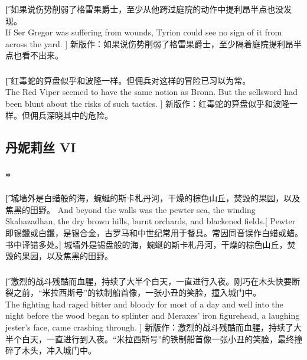 \documentclass[12pt,a4paper]{article}
\begin{document}
\subsubsection{}\t[	
	如果说伤势削弱了格雷果爵士，至少从他跨过庭院的动作中提利昂半点也没发现。\\
	If Ser Gregor was suffering from wounds, Tyrion could see no sign of it from across the yard. ]
	新版作：如果说伤势削弱了格雷果爵士，至少隔着庭院提利昂半点也看不出来。

\subsubsection{}\t[
	红毒蛇的算盘似乎和波隆一样。但佣兵对这样的冒险已习以为常。\\
	The Red Viper seemed to have the same notion as Bronn. But the sellsword had been blunt about the risks of such tactics. ]
	新版作：红毒蛇的算盘似乎和波隆一样。但佣兵深晓其中的危险。	
	
\subsection{丹妮莉丝 VI}

\subsubsection{\color{red}*}\t[
	城墙外是白蜡般的海，蜿蜒的斯卡札丹河，干燥的棕色山丘，焚毁的果园，以及焦黑的田野。
	And beyond the walls was the pewter sea, the winding Skahazadhan, the dry brown hills, burnt orchards, and blackened fields.[
	Pewter即锡鑞或白鑞，是锡合金，古罗马和中世纪常用于餐具。常因同音误作白蜡或蜡。书中译错多处。]
	城墙外是锡盘般的海，蜿蜒的斯卡札丹河，干燥的棕色山丘，焚毁的果园，以及焦黑的田野。
	
\subsubsection{}\t[
	 激烈的战斗残酷而血腥，持续了大半个白天，一直进行入夜。刚巧在木头快要断裂之前，“米拉西斯号”的铁制船首像，一张小丑的笑脸，撞入城门中。  \\
	 The fighting had raged bitter and bloody for most of a day and well into the night before the wood began to splinter and Meraxes' iron figurehead, a laughing jester's face, came crashing through. ]
	 新版作：激烈的战斗残酷而血腥，持续了大半个白天，一直进行到入夜。“米拉西斯号”的铁制船首像一张小丑的笑脸，最终撞碎了木头，冲入城门中。
	 
\end{document}
